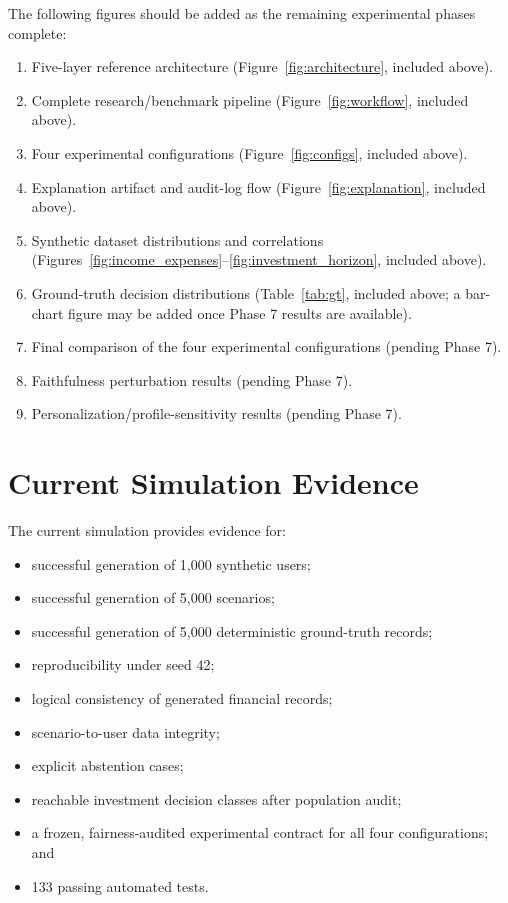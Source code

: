 \documentclass[12pt,a4paper]{article}
\begin{document}
The following figures should be added as the remaining experimental phases complete:

\begin{enumerate}
    \item Five-layer reference architecture (Figure~\ref{fig:architecture}, included above).
    \item Complete research/benchmark pipeline (Figure~\ref{fig:workflow}, included above).
    \item Four experimental configurations (Figure~\ref{fig:configs}, included above).
    \item Explanation artifact and audit-log flow (Figure~\ref{fig:explanation}, included above).
    \item Synthetic dataset distributions and correlations (Figures~\ref{fig:income_expenses}--\ref{fig:investment_horizon}, included above).
    \item Ground-truth decision distributions (Table~\ref{tab:gt}, included above; a bar-chart figure may be added once Phase 7 results are available).
    \item Final comparison of the four experimental configurations (pending Phase 7).
    \item Faithfulness perturbation results (pending Phase 7).
    \item Personalization/profile-sensitivity results (pending Phase 7).
\end{enumerate}

\section{Current Simulation Evidence}
\label{sec:evidence-records}

The current simulation provides evidence for:
\begin{itemize}
    \item successful generation of 1,000 synthetic users;
    \item successful generation of 5,000 scenarios;
    \item successful generation of 5,000 deterministic ground-truth records;
    \item reproducibility under seed 42;
    \item logical consistency of generated financial records;
    \item scenario-to-user data integrity;
    \item explicit abstention cases;
    \item reachable investment decision classes after population audit;
    \item a frozen, fairness-audited experimental contract for all four configurations; and
    \item 133 passing automated tests.
\end{itemize}
\end{document}
